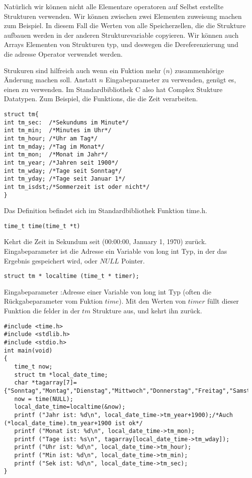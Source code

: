 \documentclass{article}[12pt]
\newenvironment{myexampleblock}[1]{%
    \tcolorbox[beamer,%
    noparskip,breakable,
    colback=White,colframe=ForestGreen,%
    colbacklower=LimeGreen!75!White,%
    title=#1]}%
    {\endtcolorbox}
\begin{document}
Natürlich wir können nicht alle Elementare operatoren auf Selbst
erstellte Strukturen verwenden. Wir können zwischen zwei Elementen zuweisung machen zum Beispiel.
In diesem Fall die Werten von alle Speicherzellen, die die Strukture aufbauen werden in der
anderen Strukturevariable copyieren. Wir können auch Arrays  Elementen von Strukturen typ, 
und deswegen die Dereferenzierung und die adresse Operator verwendet werden.

Strukuren sind hilfreich auch wenn ein Fuktion mehr ($n$) zusammenhörige Änderung machen soll. 
Anstatt $n$ Eingabeparameter zu verwenden, genügt es, einen zu verwenden. Im Standardbibliothek
C also hat Complex Stukture Datatypen. Zum Beispiel, die Funktions, die die Zeit verarbeiten.

\begin{myexampleblock}{Definition: \texttt{struct tm}}
\begin{lstlisting}
struct tm{
int tm_sec:  /*Sekundums im Minute*/
int tm_min;  /*Minutes im Uhr*/
int tm_hour; /*Uhr am Tag*/
int tm_mday; /*Tag im Monat*/
int tm_mon;  /*Monat im Jahr*/
int tm_year; /*Jahren seit 1900*/
int tm_wday; /*Tage seit Sonntag*/
int tm_yday; /*Tage seit Januar 1*/
int tm_isdst;/*Sommerzeit ist oder nicht*/
}
\end{lstlisting}
Das Definition befindet sich im Standardbibliothek Funktion time.h.
\end{myexampleblock}
\begin{myexampleblock}{Funktion:\texttt{time}}
\begin{lstlisting}
time_t time(time_t *t)
\end{lstlisting}
\vspace{-0.4cm}
Kehrt die Zeit in Sekundum seit (00:00:00, January 1, 1970) zurück.
Eingabeparameter ist die Adresse ein Variable von long int Typ, in der
das Ergebnis gespeichert wird, oder $NULL$ Pointer.
\end{myexampleblock}
\begin{myexampleblock}{Funktion:\texttt{localtime}}
\begin{lstlisting}
struct tm * localtime (time_t * timer);
\end{lstlisting}
\vspace{-0.4cm}
Eingabeparameter :Adresse einer Variable von long int Typ (often die Rückgabeparameter vom Fuktion $time$).
Mit den Werten von $timer$ füllt dieser Funktion die felder in der $tm$ Strukture aus, und kehrt ihn zurück.
\end{myexampleblock}
\begin{lstlisting}
#include <time.h>
#include <stdlib.h>
#include <stdio.h>
int main(void)
{
   time_t now;
   struct tm *local_date_time;
   char *tagarray[7]={"Sonntag","Montag","Dienstag","Mittwoch","Donnerstag","Freitag","Samstag"};
   now = time(NULL);
   local_date_time=localtime(&now);
   printf ("Jahr ist: %d\n", local_date_time->tm_year+1900);/*Auch (*local_date_time).tm_year+1900 ist ok*/
   printf ("Monat ist: %d\n", local_date_time->tm_mon);
   printf ("Tage ist: %s\n", tagarray[local_date_time->tm_wday]);
   printf ("Uhr ist: %d\n", local_date_time->tm_hour);
   printf ("Min ist: %d\n", local_date_time->tm_min);
   printf ("Sek ist: %d\n", local_date_time->tm_sec);
}
\end{lstlisting}
\end{document}
